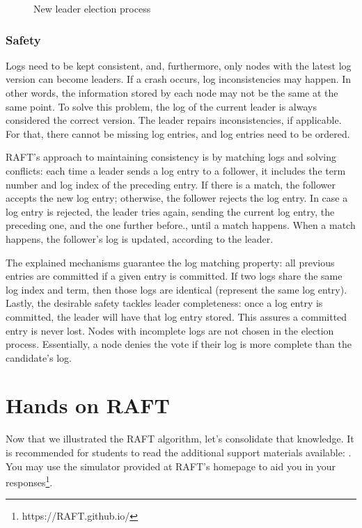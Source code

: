 \documentclass[12pt,a4paper]{article}
\begin{document}
\begin{figure}[h!]
\centering
{}%
\qquad
{}%
\caption{New leader election process}%
\label{fig:leader_election}%
\end{figure}


\subsubsection{Safety}
Logs need to be kept consistent, and, furthermore, only nodes with the latest log version can become leaders.
If a crash occurs, log inconsistencies may happen. In other words, the information stored by each node may not be the same at the same point. To solve this problem, the log of the current leader is always considered the correct version. The leader repairs inconsistencies, if applicable. For that, there cannot be missing log entries, and log entries need to be ordered.

RAFT's approach to maintaining consistency is by matching logs and solving conflicts: each time a leader sends a log entry to a follower, it includes the term number and log index of the preceding entry. If there is a match, the follower accepts the new log entry; otherwise, the follower rejects the log entry. In case a log entry is rejected, the leader tries again, sending the current log entry, the preceding one, and the one further before., until a match happens. When a match happens, the follower's log is updated, according to the leader.


The explained mechanisms guarantee the log matching property: all previous entries are committed if a given entry is committed. If two logs share the same log index and term, then those logs are identical (represent the same log entry). Lastly, the desirable safety tackles leader completeness: once a log entry is committed, the leader will have that log entry stored. This assures a committed entry is never lost. Nodes with incomplete logs are not chosen in the election process. Essentially, a node denies the vote if their log is more complete than the candidate's log.


\section{Hands on RAFT}
Now that we illustrated the RAFT algorithm, let's consolidate that knowledge. It is recommended for students to read the additional support materials available: \cite{raft_paper,raft_homepage}. You may use the simulator provided at RAFT's homepage to aid you in your responses\footnote{https://RAFT.github.io/}.
\end{document}
